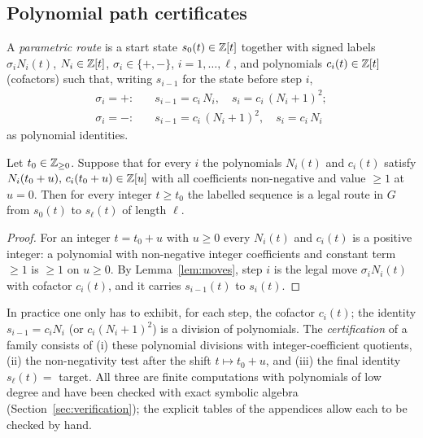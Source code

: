 \subsection{Polynomial path certificates}
\begin{definition}\label{def:param}
A \emph{parametric route} is a start state $s_0(t)\in\mathbb{Z}[t]$ together with signed labels $\sigma_iN_i(t)$, $N_i\in\mathbb{Z}[t]$, $\sigma_i\in\{+,-\}$, $i=1,\dots,\ell$, and polynomials $c_i(t)\in\mathbb{Z}[t]$ (cofactors) such that, writing $s_{i-1}$ for the state before step $i$,
\begin{align*}
\sigma_i=+:&\quad s_{i-1}=c_i\,N_i,\quad s_i=c_i\,(N_i+1)^2;\\
\sigma_i=-:&\quad s_{i-1}=c_i\,(N_i+1)^2,\quad s_i=c_i\,N_i
\end{align*}
as polynomial identities.
\end{definition}
\begin{lemma}\label{lem:certificate}
Let $t_0\in\mathbb{Z}_{\ge0}$. Suppose that for every $i$ the polynomials $N_i(t)$ and $c_i(t)$ satisfy $N_i(t_0+u),\,c_i(t_0+u)\in\mathbb{Z}[u]$ with all coefficients non-negative and value $\ge1$ at $u=0$. Then for every integer $t\ge t_0$ the labelled sequence is a legal route in $G$ from $s_0(t)$ to $s_\ell(t)$ of length $\ell$.
\end{lemma}
\begin{proof} For an integer $t=t_0+u$ with $u\ge0$ every $N_i(t)$ and $c_i(t)$ is a positive integer: a polynomial with non-negative integer coefficients and constant term $\ge1$ is $\ge1$ on $u\ge0$. By Lemma~\ref{lem:moves}, step $i$ is the legal move $\sigma_iN_i(t)$ with cofactor $c_i(t)$, and it carries $s_{i-1}(t)$ to $s_i(t)$. \end{proof}
In practice one only has to exhibit, for each step, the cofactor $c_i(t)$; the identity $s_{i-1}=c_iN_i$ (or $c_i(N_i+1)^2$) is a division of polynomials. The \emph{certification} of a family consists of (i) these polynomial divisions with integer-coefficient quotients, (ii) the non-negativity test after the shift $t\mapsto t_0+u$, and (iii) the final identity $s_\ell(t)=$ target. All three are finite computations with polynomials of low degree and have been checked with exact symbolic algebra (Section~\ref{sec:verification}); the explicit tables of the appendices allow each to be checked by hand.

